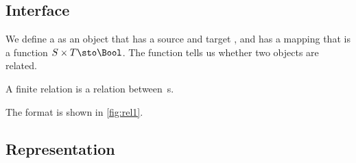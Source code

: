
\subsection*{Interface}

We define a \Relation as an object that has a source and target \Setoid, and has a mapping that is a function $S \times T \sto \Bool$.
The function tells us whether two objects are related.


A finite relation  is a relation between \FiniteSet\,s.


The format is shown in \cref{fig:rel1}.

\subsection*{Representation}{}

\begin{marginfigure}
    \caption{}
    \label{fig:rel1}
\end{marginfigure}


